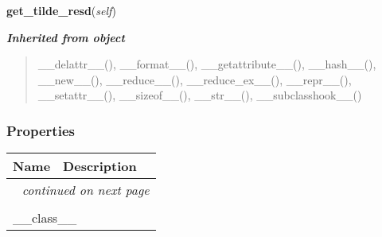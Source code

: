     \label{Tiling:Tile:get_tilde_resd}

    \vspace{0.5ex}

\hspace{.8\funcindent}\begin{boxedminipage}{\funcwidth}

    \raggedright \textbf{get\_tilde\_resd}(\textit{self})

\setlength{\parskip}{2ex}
\setlength{\parskip}{1ex}
    \end{boxedminipage}


\large{\textbf{\textit{Inherited from object}}}

\begin{quote}
\_\_delattr\_\_(), \_\_format\_\_(), \_\_getattribute\_\_(), \_\_hash\_\_(), \_\_new\_\_(), \_\_reduce\_\_(), \_\_reduce\_ex\_\_(), \_\_repr\_\_(), \_\_setattr\_\_(), \_\_sizeof\_\_(), \_\_str\_\_(), \_\_subclasshook\_\_()
\end{quote}


  \subsubsection{Properties}

    \vspace{-1cm}
\hspace{\varindent}\begin{longtable}{|p{\varnamewidth}|p{\vardescrwidth}|l}
\cline{1-2}
\cline{1-2} \centering \textbf{Name} & \centering \textbf{Description}& \\
\cline{1-2}
\endhead\cline{1-2}\multicolumn{3}{r}{\small\textit{continued on next page}}\\\endfoot\cline{1-2}
\endlastfoot\multicolumn{2}{|l|}{\textit{Inherited from object}}\\
\multicolumn{2}{|p{\varwidth}|}{\raggedright \_\_class\_\_}\\
\cline{1-2}
\end{longtable}


